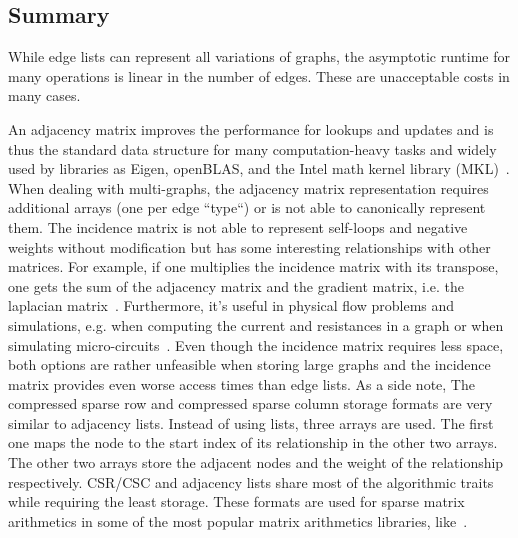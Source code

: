         
        
        \subsection{Summary}
            While edge lists can represent all variations of graphs, the asymptotic runtime for many operations is linear in the number of edges. 
            These are unacceptable costs in many cases.
            
            An adjacency matrix improves the performance for lookups and updates and is thus the standard data structure for many computation-heavy tasks and widely used by libraries as Eigen, openBLAS, and the Intel math kernel library (MKL)~\autocite{MatrixStorageSchemes-2021-03-05, EigenTheMatrixclass-2020-12-05, MatrixStorageSchemes-1999-10-01}. 
            When dealing with multi-graphs, the adjacency matrix representation requires additional arrays (one per edge ``type``) or is not able to canonically represent them.       
            The incidence matrix is not able to represent self-loops and negative weights without modification but has some interesting relationships with other matrices. 
            For example, if one multiplies the incidence matrix with its transpose, one gets the sum of the adjacency matrix and the gradient matrix, i.e. the laplacian matrix~\autocite{brouwer2011spectra}. 
            Furthermore, it's useful in physical flow problems and simulations, e.g. when computing the current and resistances in a graph or when simulating micro-circuits~\autocite{weinberg1958kirchhoff}.
            Even though the incidence matrix requires less space, both options are rather unfeasible when storing large graphs and the incidence matrix provides even worse access times than edge lists.        
            As a side note, The compressed sparse row and compressed sparse column storage formats are very similar to adjacency lists. 
            Instead of using lists, three arrays are used. 
            The first one maps the node to the start index of its relationship in the other two arrays. 
            The other two arrays store the adjacent nodes and the weight of the relationship respectively. 
            CSR/CSC and adjacency lists share most of the algorithmic traits while requiring the least storage. 
            These formats are used for sparse matrix arithmetics in some of the most popular matrix arithmetics libraries, like~\autocite{MatrixStorageSchemes-2021-03-05, EigenTheMatrixclass-2020-12-05, MatrixStorageSchemes-1999-10-01}. 
            
